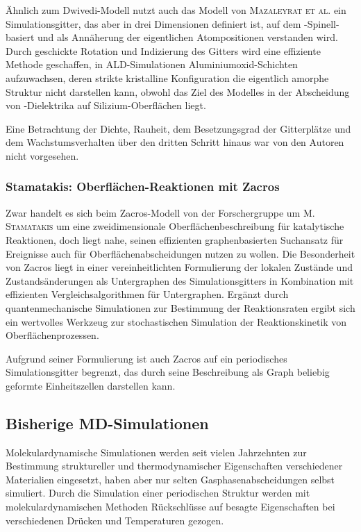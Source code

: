 Ähnlich zum Dwivedi-Modell nutzt auch das Modell von \textsc{Mazaleyrat et al.}\cite{mazaleyrat_methodology_2005} ein Simulationsgitter, das aber in drei Dimensionen definiert ist, auf dem -Spinell-basiert und als Annäherung der eigentlichen Atompositionen verstanden wird.
Durch geschickte Rotation und Indizierung des Gitters wird eine effiziente Methode geschaffen, in ALD-Simulationen Aluminiumoxid-Schichten aufzuwachsen, deren strikte kristalline Konfiguration die eigentlich amorphe Struktur nicht darstellen kann, obwohl das Ziel des Modelles in der Abscheidung von -Dielektrika auf Silizium-Oberflächen liegt.

Eine Betrachtung der Dichte, Rauheit, dem Besetzungsgrad der Gitterplätze und dem Wachstumsverhalten über den dritten Schritt hinaus war von den Autoren nicht vorgesehen.

\subsubsection{Stamatakis: Oberflächen-Reaktionen mit Zacros}

Zwar handelt es sich beim Zacros-Modell von der Forschergruppe um \textsc{M. Stamatakis}\cite{stamatakis_graph-theoretical_2011, nielsen_parallel_2013, stamatakis_zacros_2014} um eine zweidimensionale Oberflächenbeschreibung für katalytische Reaktionen, doch liegt nahe, seinen effizienten graphenbasierten Suchansatz für Ereignisse auch für Oberflächenabscheidungen nutzen zu wollen.
Die Besonderheit von Zacros liegt in einer vereinheitlichten Formulierung der lokalen Zustände und Zustandsänderungen als Untergraphen des Simulationsgitters in Kombination mit effizienten Vergleichsalgorithmen für Untergraphen.
Ergänzt durch quantenmechanische Simulationen zur Bestimmung der Reaktionsraten ergibt sich ein wertvolles Werkzeug zur stochastischen Simulation der Reaktionskinetik von Oberflächenprozessen.

Aufgrund seiner Formulierung ist auch Zacros auf ein periodisches Simulationsgitter begrenzt, das durch seine Beschreibung als Graph beliebig geformte Einheitszellen darstellen kann.

\subsection{Bisherige MD-Simulationen}

Molekulardynamische Simulationen werden seit vielen Jahrzehnten zur Bestimmung struktureller und thermodynamischer Eigenschaften verschiedener Materialien eingesetzt, haben aber nur selten Gasphasenabscheidungen selbst simuliert.
Durch die Simulation einer periodischen Struktur werden mit molekulardynamischen Methoden Rückschlüsse auf besagte Eigenschaften bei verschiedenen Drücken und Temperaturen gezogen.

